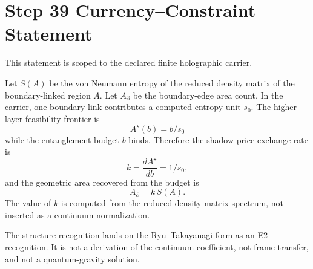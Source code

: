 \documentclass[11pt]{article}
\begin{document}
\section*{Step 39 Currency--Constraint Statement}
This statement is scoped to the declared finite holographic carrier.

Let \(S(A)\) be the von Neumann entropy of the reduced density matrix of the boundary-linked region \(A\). Let \(A_{\partial}\) be the boundary-edge area count. In the carrier, one boundary link contributes a computed entropy unit \(s_0\). The higher-layer feasibility frontier is
\[
  A^\star(b) = b/s_0
\]
while the entanglement budget \(b\) binds. Therefore the shadow-price exchange rate is
\[
  k = \frac{dA^\star}{db} = 1/s_0,
\]
and the geometric area recovered from the budget is
\[
  A_{\partial} = k\,S(A).
\]
The value of \(k\) is computed from the reduced-density-matrix spectrum, not inserted as a continuum normalization.

The structure recognition-lands on the Ryu--Takayanagi form as an E2 recognition. It is not a derivation of the continuum coefficient, not frame transfer, and not a quantum-gravity solution.
\end{document}
